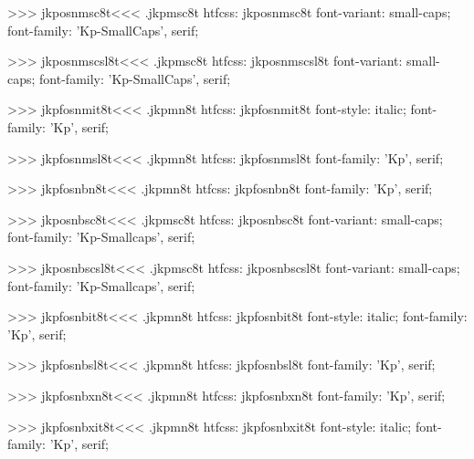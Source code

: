 >>>
\<jkposnmsc8t\><<<
.jkpmsc8t
htfcss:  jkposnmsc8t  font-variant: small-caps; font-family: 'Kp-SmallCaps', serif;

>>>
\<jkposnmscsl8t\><<<
.jkpmsc8t
htfcss:  jkposnmscsl8t  font-variant: small-caps; font-family: 'Kp-SmallCaps', serif;

>>>
\<jkpfosnmit8t\><<<
.jkpmn8t
htfcss:  jkpfosnmit8t  font-style: italic; font-family: 'Kp', serif;

>>>
\<jkpfosnmsl8t\><<<
.jkpmn8t
htfcss:  jkpfosnmsl8t  font-family: 'Kp', serif;

>>>
\<jkpfosnbn8t\><<<
.jkpmn8t
htfcss:  jkpfosnbn8t  font-family: 'Kp', serif;

>>>
\<jkposnbsc8t\><<<
.jkpmsc8t
htfcss:  jkposnbsc8t  font-variant: small-caps; font-family: 'Kp-Smallcaps', serif;

>>>
\<jkposnbscsl8t\><<<
.jkpmsc8t
htfcss:  jkposnbscsl8t  font-variant: small-caps; font-family: 'Kp-Smallcaps', serif;

>>>
\<jkpfosnbit8t\><<<
.jkpmn8t
htfcss:  jkpfosnbit8t  font-style: italic; font-family: 'Kp', serif;

>>>
\<jkpfosnbsl8t\><<<
.jkpmn8t
htfcss:  jkpfosnbsl8t  font-family: 'Kp', serif;

>>>
\<jkpfosnbxn8t\><<<
.jkpmn8t
htfcss:  jkpfosnbxn8t  font-family: 'Kp', serif;

>>>
\<jkpfosnbxit8t\><<<
.jkpmn8t
htfcss:  jkpfosnbxit8t  font-style: italic; font-family: 'Kp', serif;

